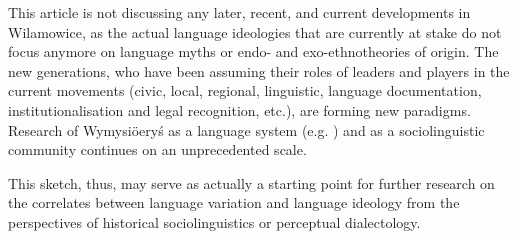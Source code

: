 \documentclass[output=paper]{langscibook}
\begin{document}
This article is not discussing any later, recent, and current developments in Wilamowice, as the actual language ideologies that are currently at stake do not focus anymore on language myths or endo- and exo-ethnotheories of origin. The new generations, who have been assuming their roles of leaders and players in the current movements (civic, local, regional, linguistic, language documentation, institutionalisation and legal recognition, etc.), are forming new paradigms. Research of Wymysiöeryś as a language system (e.g. \citealt{andrason_polish_2014, andrason_slavic_2015, andrason_vilamovicean_2015, zak_influence_2016}) and as a sociolinguistic community \citep{krol_czym_2016, neels_language_2016, wicherkiewicz_researching_2016} continues on an unprecedented scale.

This sketch, thus, may serve as actually a starting point for further research on the correlates between language variation and language ideology from the perspectives of historical sociolinguistics or perceptual dialectology.
\sloppy
\printbibliography[heading=subbibliography,notkeyword=this]
\end{document}
